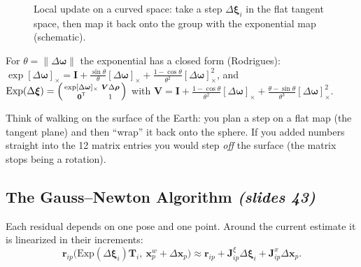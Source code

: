 \documentclass[11pt,a4paper]{article}
\newcommand{\slr}[1]{\texorpdfstring{\emph{(slides #1)}}{(slides #1)}}
\newcommand{\R}{\mathbb{R}}
\newcommand{\SE}{\mathrm{SE}(3)}
\newcommand{\se}{\mathfrak{se}(3)}
\newcommand{\sk}[1]{[#1]_{\times}}
\newcommand{\norm}[1]{\lVert #1\rVert}
\newcommand{\tr}{^{\mathsf T}}
\begin{document}
\begin{figure}[H]
\centering
{}
\caption{Local update on a curved space: take a step $\Delta\bm\xi_i$ in the flat tangent space, then map it back onto the group with the exponential map (schematic).}
\end{figure}

\begin{beyond}
For $\theta=\norm{\Delta\bm\omega}$ the exponential has a closed form (Rodrigues): $\exp\sk{\Delta\bm\omega}=\bm I+\frac{\sin\theta}{\theta}\sk{\Delta\bm\omega}+\frac{1-\cos\theta}{\theta^2}\sk{\Delta\bm\omega}^2$, and $\mathrm{Exp}(\Delta\bm\xi)=\begin{psmallmatrix}\exp\sk{\Delta\bm\omega}&\bm V\Delta\bm\rho\\\bm0\tr&1\end{psmallmatrix}$ with $\bm V=\bm I+\frac{1-\cos\theta}{\theta^2}\sk{\Delta\bm\omega}+\frac{\theta-\sin\theta}{\theta^3}\sk{\Delta\bm\omega}^2$.
\end{beyond}

\begin{intuition}
Think of walking on the surface of the Earth: you plan a step on a flat map (the tangent plane) and then ``wrap'' it back onto the sphere. If you added numbers straight into the 12 matrix entries you would step \emph{off} the surface (the matrix stops being a rotation).
\end{intuition}

\subsection{The Gauss--Newton Algorithm \slr{43}}
Each residual depends on one pose and one point. Around the current estimate it is linearized in their increments:
\[
\bm r_{ip}\bigl(\mathrm{Exp}(\Delta\bm\xi_i)\bm T_i,\ \bm x^w_p+\Delta\bm x_p\bigr)\approx\bm r_{ip}+\bm J^{\xi}_{ip}\Delta\bm\xi_i+\bm J^x_{ip}\Delta\bm x_p .
\]
\end{document}
